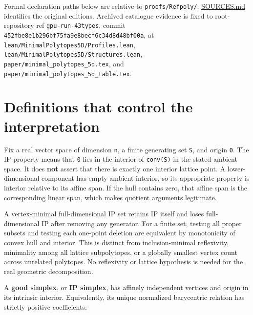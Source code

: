 \documentclass[11pt,a4paper,oneside]{report}
\begin{document}
Formal declaration paths below are relative to
\texttt{proofs/\allowbreak{}Refpoly/};
\href{../../proofs/SOURCES.md}{SOURCES.md} identifies the original
editions. Archived catalogue evidence is fixed to root-repository ref
\texttt{gpu-\allowbreak{}run-\allowbreak{}43types}, commit
\texttt{452fbe8e\allowbreak{}1b296bf7\allowbreak{}5fa9e8be\allowbreak{}cf6c34d8\allowbreak{}d48bf00a},
at
\texttt{lean/\allowbreak{}MinimalP\allowbreak{}olytopes\allowbreak{}5D/\allowbreak{}Profiles\allowbreak{}.\allowbreak{}lean},
\texttt{lean/\allowbreak{}MinimalP\allowbreak{}olytopes\allowbreak{}5D/\allowbreak{}Structur\allowbreak{}es.\allowbreak{}lean},
\texttt{paper/\allowbreak{}minimal\_\allowbreak{}polytope\allowbreak{}s\_\allowbreak{}5d.\allowbreak{}tex},
and
\texttt{paper/\allowbreak{}minimal\_\allowbreak{}polytope\allowbreak{}s\_\allowbreak{}5d\_\allowbreak{}table.\allowbreak{}tex}.

\section{Definitions that control the
interpretation}\label{minimal-ip-circuits-and-types--definitions-that-control-the-interpretation}

Fix a real vector space of dimension \texttt{n}, a finite generating set
\texttt{S}, and origin \texttt{0}. The IP property means that \texttt{0}
lies in the interior of \texttt{conv(\allowbreak{}S)} in the stated
ambient space. It does \textbf{not} assert that there is exactly one
interior lattice point. A lower-dimensional component has empty ambient
interior, so its appropriate property is interior relative to its affine
span. If the hull contains zero, that affine span is the corresponding
linear span, which makes quotient arguments legitimate.

A vertex-minimal full-dimensional IP set retains IP itself and loses
full-dimensional IP after removing any generator. For a finite set,
testing all proper subsets and testing each one-point deletion are
equivalent by monotonicity of convex hull and interior. This is distinct
from inclusion-minimal reflexivity, minimality among all lattice
subpolytopes, or a globally smallest vertex count across unrelated
polytopes. No reflexivity or lattice hypothesis is needed for the real
geometric decomposition.

A \textbf{good simplex}, or \textbf{IP simplex}, has affinely
independent vertices and origin in its intrinsic interior. Equivalently,
its unique normalized barycentric relation has strictly positive
coefficients:
\end{document}
